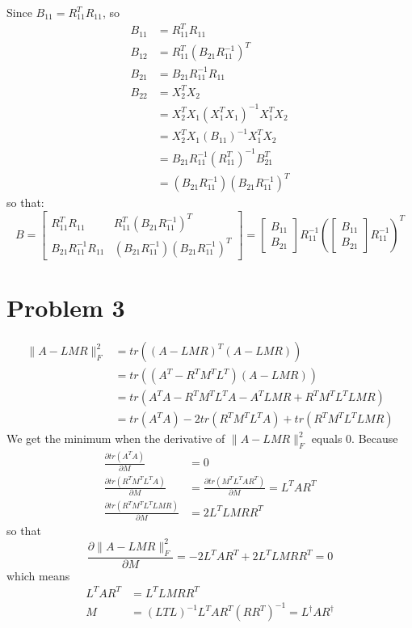 \documentclass[a4paper, 11pt]{article}
\begin{document}
Since $B_{11} = R_{11}^TR_{11} $, so
\begin{align*}
B_{11} &= R_{11}^TR_{11} \\
B_{12} &= R_{11}^T(B_{21}R_{11}^{-1})^T \\
B_{21} &= B_{21}R_{11}^{-1}R_{11} \\
B_{22} &= X_2^T X_2 \\
	   &= X_2^T X_1 (X_1^T X_1)^{-1} X_1^T X_2 \\
	   &= X_2^T X_1(B_{11})^{-1} X_1^T X_2 \\
	   &= B_{21}R_{11}^{-1}(R_{11}^T)^{-1}B_{21}^T \\
	   &= (B_{21}R_{11}^{-1})(B_{21}R_{11}^{-1})^T
\end{align*}
so that:
$$
B=\begin{bmatrix}
R_{11}^T R_{11} & R_{11}^T(B_{21}R_{11}^{-1})^T \\
B_{21}R_{11}^{-1}R_{11} & (B_{21}R_{11}^{-1})(B_{21}R_{11}^{-1})^T 
\end{bmatrix} = \begin{bmatrix}
B_{11} \\ B_{21}
\end{bmatrix} R_{11}^{-1} ( \begin{bmatrix}
B_{11} \\ B_{21}
\end{bmatrix} R_{11}^{-1})^T
$$

\section*{Problem 3}

\begin{align*}
\| A-LMR \|_F^2 &= tr((A-LMR)^T(A-LMR)) \\
			    &= tr((A^T-R^TM^TL^T)(A-LMR)) \\
			    &= tr(A^TA-R^TM^TL^TA-A^TLMR+R^TM^TL^TLMR) \\
			    &= tr(A^TA)-2tr(R^TM^TL^TA)+tr(R^TM^TL^TLMR)
\end{align*}
We get the minimum when the derivative of $\| A-LMR\|_{F}^2 $ equals 0.
Because
\begin{align*}
 \frac{\partial tr(A^TA)}{\partial M} &= 0 \\
 \frac{\partial tr(R^TM^TL^TA)}{\partial M} &= \frac{\partial tr(M^TL^TAR^T)}{\partial M} = L^TAR^T \\
 \frac{\partial tr(R^TM^TL^TLMR)}{\partial M} &= 2L^TLMRR^T
\end{align*}
so that
$$
\frac{\partial \| A-LMR \|_F^2}{\partial M} = -2L^TAR^T + 2L^TLMRR^T=0
$$
which means
\begin{align*}
L^TAR^T &= L^TLMRR^T \\
M &= (LTL)^{-1}L^T A R^T(RR^T)^{-1} = L^\dagger A R^\dagger
\end{align*}
\end{document}

